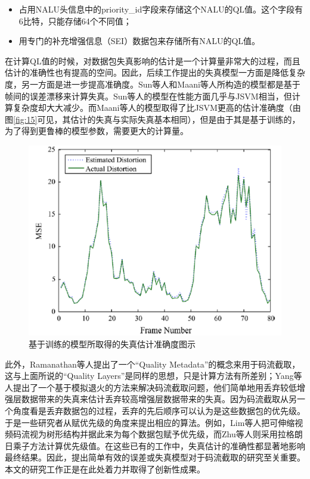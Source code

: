 \begin{itemize}
\item 占用NALU头信息中的priority\_id字段来存储这个NALU的QL值。这个字段有6比特，只能存储64个不同值；
\item 用专门的补充增强信息（SEI）数据包来存储所有NALU的QL值。
\end{itemize}

在计算QL值的时候，对数据包失真影响的估计是一个计算量非常大的过程，而且估计的准确性也有提高的空间。因此，后续工作提出的失真模型一方面是降低复杂度，另一方面是进一步提高准确度。Sun等人\supercite{Sun2009}和Maani等人\supercite{Maani2009}所构造的模型都是基于帧间的误差漂移来计算失真。Sun等人的模型在性能方面几乎与JSVM相当，但计算复杂度却大大减少。而Maani等人的模型取得了比JSVM更高的估计准确度（由图\ref{fig:15}\supercite{Maani2009}可见，其估计的失真与实际失真基本相同），但是由于其是基于训练的，为了得到更鲁棒的模型参数，需要更大的计算量。

\begin{figure}[h]
	\centering
	\includegraphics[width = 0.8\linewidth]{clip/16.png}
	\caption{基于训练的模型所取得的失真估计准确度图示\label{fig:16}}
\end{figure}

此外，Ramanathan等人\supercite{Ramanathan2012}提出了一个“Quality Metadata”的概念来用于码流截取，这与上面所说的“Quality Layers”是同样的思想，只是计算方法有所差别；Yang等人\supercite{Yang2013}提出了一个基于模拟退火的方法来解决码流截取问题，他们简单地用丢弃较低增强层数据带来的失真来估计丢弃较高增强层数据带来的失真。因为码流截取从另一个角度看是丢弃数据包的过程，丢弃的先后顺序可以认为是这些数据包的优先级。于是一些研究者从赋优先级的角度来提出相应的算法。例如，Lim等人\supercite{Lim2006}把可伸缩视频码流视为树形结构并据此来为每个数据包赋予优先级，而Zhu等人\supercite{Zhu2011}则采用拉格朗日乘子方法计算优先级值。在这些已有的工作中，失真估计的准确性都显著地影响最终结果。因此，提出简单有效的误差或失真模型对于码流截取的研究至关重要。本文的研究工作正是在此处着力并取得了创新性成果。


